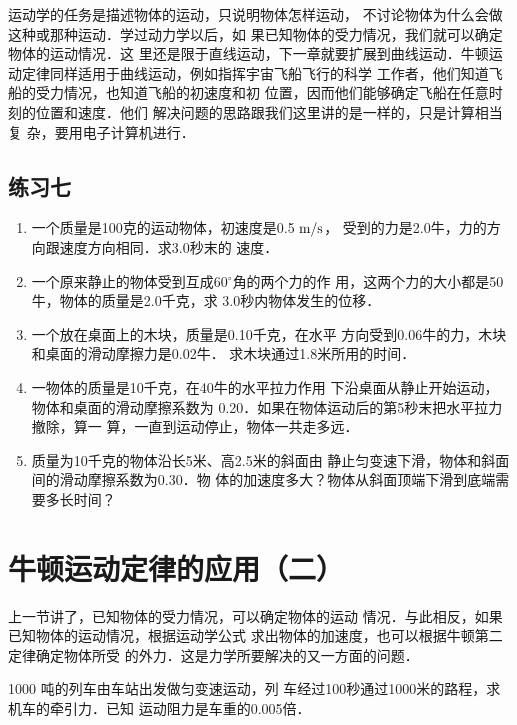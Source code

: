     运动学的任务是描述物体的运动，只说明物体怎样运动，
不讨论物体为什么会做这种或那种运动．学过动力学以后，如
果已知物体的受力情况，我们就可以确定物体的运动情况．这
里还是限于直线运动，下一章就要扩展到曲线运动．牛顿运
动定律同样适用于曲线运动，例如指挥宇宙飞船飞行的科学
工作者，他们知道飞船的受力情况，也知道飞船的初速度和初
位置，因而他们能够确定飞船在任意时刻的位置和速度．他们
解决问题的思路跟我们这里讲的是一样的，只是计算相当复
杂，要用电子计算机进行．


\subsection*{练习七}
\begin{enumerate}
\item 一个质量是100克的运动物体，初速度是0.5$\;\text{m}/\text{s}$，
受到的力是2.0牛，力的方向跟速度方向相同．求3.0秒末的
速度．
\item 一个原来静止的物体受到互成60$^\circ$角的两个力的作
用，这两个力的大小都是50牛，物体的质量是2.0千克，求
3.0秒内物体发生的位移．
\item 一个放在桌面上的木块，质量是0.10千克，在水平
方向受到0.06牛的力，木块和桌面的滑动摩擦力是0.02牛．
求木块通过1.8米所用的时间．
\item 一物体的质量是10千克，在40牛的水平拉力作用
下沿桌面从静止开始运动，物体和桌面的滑动摩擦系数为
0.20．如果在物体运动后的第5秒末把水平拉力撤除，算一
算，一直到运动停止，物体一共走多远．
\item  质量为10千克的物体沿长5米、高2.5米的斜面由
静止匀变速下滑，物体和斜面间的滑动摩擦系数为0.30．物
体的加速度多大？物体从斜面顶端下滑到底端需要多长时间？


\end{enumerate}

\section{牛顿运动定律的应用（二）}
上一节讲了，已知物体的受力情况，可以确定物体的运动
情况．与此相反，如果已知物体的运动情况，根据运动学公式
求出物体的加速度，也可以根据牛顿第二定律确定物体所受
的外力．这是力学所要解决的又一方面的问题．

\begin{example}
1000 吨的列车由车站出发做匀变速运动，列
车经过100秒通过1000米的路程，求机车的牵引力．已知
运动阻力是车重的0.005倍．
\end{example}


